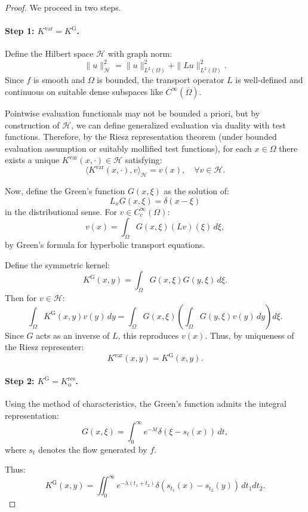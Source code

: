 \documentclass[11pt]{article}
\theoremstyle{plain}
\def\[{\begin{equation}}
\def\]{\end{equation}}
\begin{document}
\begin{proof}
We proceed in two steps.

\paragraph{Step 1: $K^{\mathrm{var}} = K^{\mathrm{G}}$.}
Define the Hilbert space $\mathcal{H}$ with graph norm:
\[
\|u\|_{\mathcal{H}}^2 = \|u\|_{L^2(\Omega)}^2 + \|Lu\|_{L^2(\Omega)}^2.
\]
Since $f$ is smooth and $\Omega$ is bounded, the transport operator $L$ is well-defined and continuous on suitable dense subspaces like $C^\infty(\overline{\Omega})$.

Pointwise evaluation functionals may not be bounded a priori, but by construction of $\mathcal{H}$, we can define generalized evaluation via duality with test functions. Therefore, by the Riesz representation theorem (under bounded evaluation assumption or suitably mollified test functions), for each $x \in \Omega$ there exists a unique $K^{\mathrm{var}}(x, \cdot) \in \mathcal{H}$ satisfying:
\[
\langle K^{\mathrm{var}}(x, \cdot), v \rangle_{\mathcal{H}} = v(x), \quad \forall v \in \mathcal{H}.
\]

Now, define the Green's function $G(x, \xi)$ as the solution of:
\[
L_x G(x, \xi) = \delta(x-\xi)
\]
in the distributional sense. For $v \in C_c^\infty(\Omega)$:
\[
v(x) = \int_{\Omega} G(x, \xi) (Lv)(\xi) \, d\xi,
\]
by Green's formula for hyperbolic transport equations.

Define the symmetric kernel:
\[
K^{\mathrm{G}}(x, y) = \int_{\Omega} G(x, \xi) G(y, \xi) \, d\xi.
\]
Then for $v \in \mathcal{H}$:
\[
\int_{\Omega} K^{\mathrm{G}}(x, y) v(y) \, dy = \int_{\Omega} G(x, \xi) \left( \int_{\Omega} G(y, \xi) v(y) \, dy \right) d\xi.
\]
Since $G$ acts as an inverse of $L$, this reproduces $v(x)$. Thus, by uniqueness of the Riesz representer:
\[
K^{\mathrm{var}}(x, y) = K^{\mathrm{G}}(x, y).
\]

\paragraph{Step 2: $K^{\mathrm{G}} = K^{\mathrm{res}}_\alpha$.}
Using the method of characteristics, the Green’s function admits the integral representation:
\[
G(x, \xi) = \int_0^\infty e^{-\lambda t} \delta(\xi - s_t(x)) \, dt,
\]
where $s_t$ denotes the flow generated by $f$.

Thus:
\[
K^{\mathrm{G}}(x, y) = \iint_0^\infty e^{-\lambda(t_1+t_2)} \delta(s_{t_1}(x) - s_{t_2}(y)) \, dt_1 dt_2.
\]


\end{proof}
\end{document}
